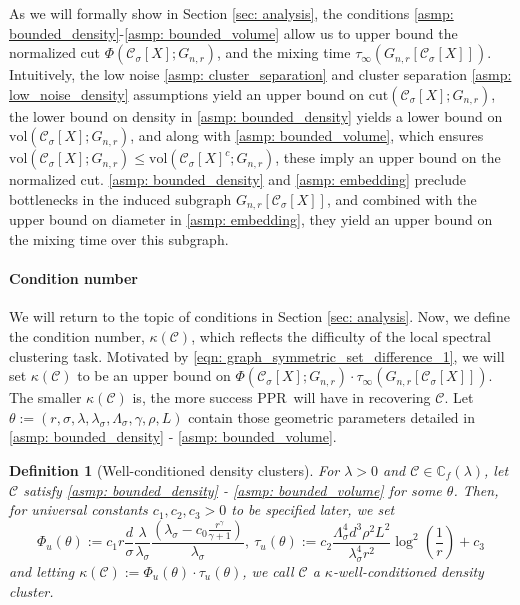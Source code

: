 \documentclass{article}
\newcommand{\diam}{\rho}
\newcommand{\vol}{\mathrm{vol}}
\newcommand{\cut}{\mathrm{cut}}
\newcommand{\1}{\mathbf{1}}
\newcommand{\Phibf}{\Phi_{u}}
\newcommand{\taubf}{\tau_{u}}
\newcommand{\Xbf}{X}             %
\newcommand{\Cbb}{\mathbb{C}}
\newcommand{\Cset}{\mathcal{C}}
\newcommand{\Csig}{\Cset_{\sigma}}
\newcommand{\pprspace}{{\sc PPR~}}
\theoremstyle{aldenthm}
\newtheorem{definition}{Definition}
\theoremstyle{aldenrmrk}
\begin{document}
As we will formally show in Section \ref{sec: analysis}, the conditions \ref{asmp: bounded_density}-\ref{asmp: bounded_volume} allow us to upper bound the normalized cut $\Phi(\Csig[\Xbf]; G_{n,r})$, and the mixing time $\tau_{\infty}(G_{n,r}[\Csig[\Xbf]])$. Intuitively, the low noise \ref{asmp: cluster_separation} and cluster separation \ref{asmp: low_noise_density} assumptions yield an upper bound on $\cut(\Csig[\Xbf]; G_{n,r})$, the lower bound on density in \ref{asmp: bounded_density} yields a lower bound on $\vol(\Csig[\Xbf]; G_{n,r})$, and along with \ref{asmp: bounded_volume}, which ensures $\vol(\Csig[\Xbf]; G_{n,r}) \leq \vol(\Csig[\Xbf]^c; G_{n,r})$, these imply an upper bound on the normalized cut. \ref{asmp: bounded_density} and \ref{asmp: embedding} preclude bottlenecks in the induced subgraph $G_{n,r}[\Csig[\Xbf]]$, and combined with the upper bound on diameter in \ref{asmp: embedding}, they yield an upper bound on the mixing time over this subgraph.

\paragraph{Condition number} We will return to the topic of conditions in Section \ref{sec: analysis}. Now, we define the condition number, $\kappa(\Cset)$, which reflects the difficulty of the local spectral clustering task. Motivated by \eqref{eqn: graph_symmetric_set_difference_1}, we will set $\kappa(\Cset)$ to be an upper bound on $\Phi(\Csig[\Xbf]; G_{n,r}) \cdot \tau_{\infty}(G_{n,r}[\Csig[\Xbf]])$. The smaller $\kappa(\Cset)$ is, the more success \pprspace will have in recovering $\Cset$. Let $\theta := (r, \sigma, \lambda, \lambda_{\sigma}, \Lambda_{\sigma}, \gamma, \diam, L)$ contain those geometric parameters detailed in \ref{asmp: bounded_density} - \ref{asmp: bounded_volume}.

\begin{definition}[Well-conditioned density clusters]
	For $\lambda > 0$ and $\Cset \in \Cbb_f(\lambda)$, let $\Cset$ satisfy \ref{asmp: bounded_density} - \ref{asmp: bounded_volume} for some $\theta$. Then, for universal constants $c_1, c_2, c_3 > 0$ to be specified later, we set
	\begin{equation}
	\label{eqn: condition_number_1}
	\Phibf(\theta) 
	:= c_1 r \frac{d}{\sigma} \frac{\lambda}{\lambda_{\sigma}} \frac{(\lambda_{\sigma} - c_0 \frac{r^{\gamma}}{\gamma + 1})}{\lambda_{\sigma}},~ 
	\taubf(\theta) := c_2 \frac{\Lambda_{\sigma}^4 d^3 \rho^2 L^2}{\lambda_{\sigma}^4 r^2} \log^2\left(\frac{1}{r}\right) + c_3
	\end{equation}
	and letting $\kappa(\Cset) := \Phi_{u}(\theta) \cdot \tau_{u}(\theta)$, we call $\Cset$ a \textrm{$\kappa$-well-conditioned density cluster}.
\end{definition}
\end{document}
